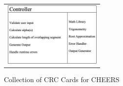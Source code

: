 \begin{figure}[h!]
        \begin{tabular}{@{}c@{}}
          \includegraphics[width=.3\linewidth,height=90pt]{resources/Controller.png}
        \end{tabular}

        \vspace{\floatsep}
      \caption{Collection of CRC Cards for CHEERS}\label{fig:myfig}
    \end{figure}
